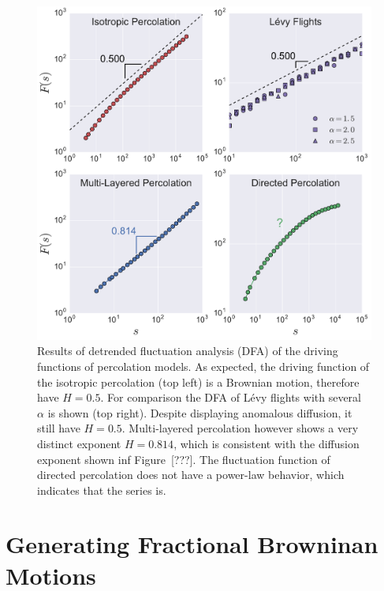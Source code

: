 \begin{figure}
\begin{center}
    \includegraphics[scale=0.45]{chapters/ch6-asle/figs/dfaresults}
\end{center}
\caption{Results of detrended fluctuation analysis (DFA) of the driving
    functions of percolation models. As expected, the driving function of the
    isotropic percolation (top left) is a Brownian motion, therefore have
    $H=0.5$. For comparison the DFA of L\'evy flights with several $\alpha$ is
    shown (top right). Despite displaying anomalous diffusion, it still have
    $H=0.5$. Multi-layered percolation however shows a very distinct exponent
    $H=0.814$, which is consistent with the diffusion exponent shown inf
    Figure~[???]. The fluctuation function of directed percolation does not
    have a power-law behavior, which indicates that the series is.}
\label{fig:dfaresults}
\end{figure}



\section{Generating Fractional Browninan Motions}
\label{sec:fbm}

